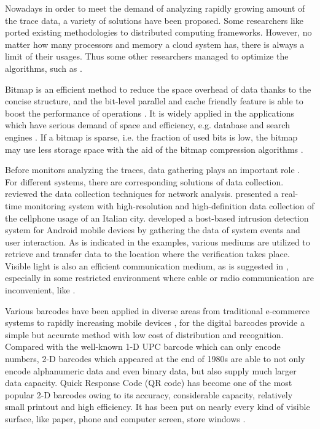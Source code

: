 Nowadays in order to meet the demand of analyzing rapidly growing amount of the trace data, a variety of solutions have been proposed. Some researchers like \cite{barre2012mapreduce} ported existing methodologies to distributed computing frameworks. However, no matter how many processors and memory a cloud system has, there is always a limit of their usages. Thus some other researchers managed to optimize the algorithms, such as \cite{havelund2001monitoring}.

Bitmap is an efficient method to reduce the space overhead of data thanks to the concise structure, and the bit-level parallel and cache friendly feature is able to boost the performance of operations \citep{culpepper2010efficient}. It is widely applied in the applications which have serious demand of space and efficiency, e.g. database and search engines \citep{lemire2014}. If a bitmap is sparse, i.e. the fraction of used bits is low, the bitmap may use less storage space with the aid of the bitmap compression algorithms \citep{antoshenkov1995byte}.

Before monitors analyzing the traces, data gathering plays an important role \citep{casley1988collection}. For different systems, there are corresponding solutions of data collection. \cite{zwijze2005auditing} reviewed the data collection techniques for network analysis. \cite{calabrese2011real} presented a real-time monitoring system with high-resolution and high-definition data collection of the cellphone usage of an Italian city. \cite{shabtai2010applying} developed a host-based intrusion detection system for Android mobile devices by gathering the data of system events and user interaction. As is indicated in the examples, various mediums are utilized to retrieve and transfer data to the location where the verification takes place. Visible light is also an efficient communication medium, as is suggested in \cite{komine2004fundamental}, especially in some restricted environment where cable or radio communication are inconvenient, like \cite{vasilescu2005data}.

Various barcodes have been applied in diverse areas from traditional e-commerce systems to rapidly increasing mobile devices \citep{gao2007understanding}, for the digital barcodes provide a simple but accurate method with low cost of distribution and recognition. Compared with the well-known 1-D UPC barcode which can only encode numbers, 2-D barcodes which appeared at the end of 1980s are able to not only encode alphanumeric data and even binary data, but also supply much larger data capacity. Quick Response Code (QR code) \citep{qrcode-about} has become one of the most popular 2-D barcodes owing to its accuracy, considerable capacity, relatively small printout and high efficiency. It has been put on nearly every kind of visible surface, like paper, phone and computer screen, store windows \citep{okazaki2012benchmarking}.

